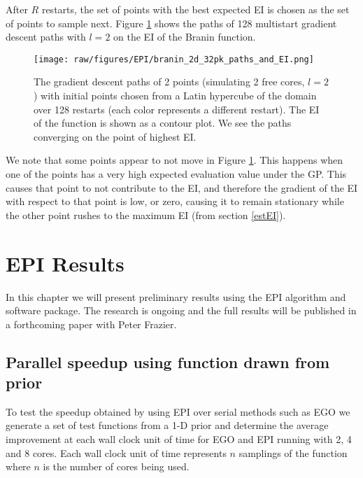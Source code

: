 After $R$ restarts, the set of points with the best expected EI is chosen as the set of points to sample next. Figure \ref{fig:pk_paths} shows the paths of 128 multistart gradient descent paths with $l = 2$ on the EI of the Branin function.

\begin{figure}[hpt]
 	\centerline{\texttt{[image: raw/figures/EPI/branin\_2d\_32pk\_paths\_and\_EI.png]}}
    \caption[Gradient descent paths in Branin Function]{The gradient descent paths of 2 points (simulating 2 free cores, $l=2$) with initial points chosen from a Latin hypercube of the domain over 128 restarts (each color represents a different restart). The EI of the function is shown as a contour plot. We see the paths converging on the point of highest EI.}
 	\label{fig:pk_paths}
 \end{figure}

 We note that some points appear to not move in Figure \ref{fig:pk_paths}. This happens when one of the points has a very high expected evaluation value under the GP. This causes that point to not contribute to the EI, and therefore the gradient of the EI with respect to that point is low, or zero, causing it to remain stationary while the other point rushes to the maximum EI (from section \ref{estEI}).



\section{EPI Results} %
\label{cha:EPI Results}

In this chapter we will present preliminary results using the EPI algorithm and software package. The research is ongoing and the full results will be published in a forthcoming paper with Peter Frazier.


\subsection{Parallel speedup using function drawn from prior}

To test the speedup obtained by using EPI over serial methods such as EGO we generate a set of test functions from a 1-D prior and determine the average improvement at each wall clock unit of time for EGO and EPI running with 2, 4 and 8 cores. Each wall clock unit of time represents $n$ samplings of the function where $n$ is the number of cores being used.

